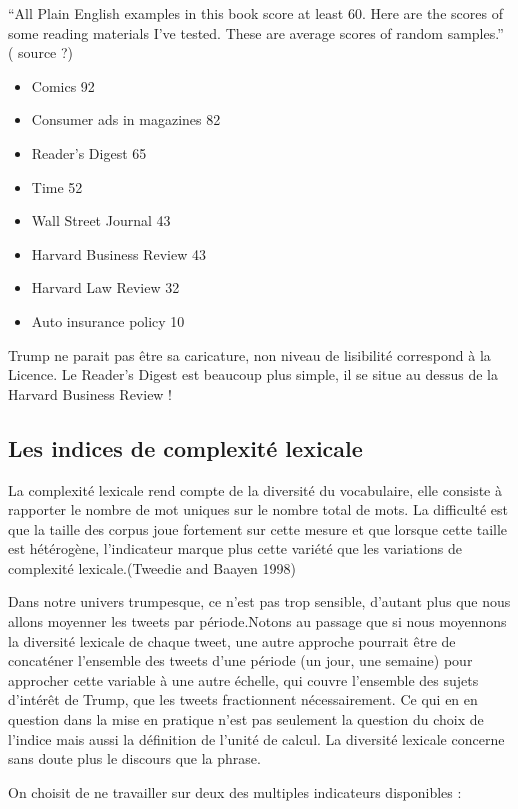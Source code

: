 \documentclass[
  letterpaper,
  DIV=11,
  numbers=noendperiod]{scrreprt}
\begin{document}
``All Plain English examples in this book score at least 60. Here are
the scores of some reading materials I've tested. These are average
scores of random samples.'' ( source ?)

\begin{itemize}
\item
  Comics 92
\item
  Consumer ads in magazines 82
\item
  Reader's Digest 65
\item
  Time 52
\item
  Wall Street Journal 43
\item
  Harvard Business Review 43
\item
  Harvard Law Review 32
\item
  Auto insurance policy 10
\end{itemize}

Trump ne parait pas être sa caricature, non niveau de lisibilité
correspond à la Licence. Le Reader's Digest est beaucoup plus simple, il
se situe au dessus de la Harvard Business Review !

\subsection{Les indices de complexité
lexicale}\label{les-indices-de-complexituxe9-lexicale}

La complexité lexicale rend compte de la diversité du vocabulaire, elle
consiste à rapporter le nombre de mot uniques sur le nombre total de
mots. La difficulté est que la taille des corpus joue fortement sur
cette mesure et que lorsque cette taille est hétérogène, l'indicateur
marque plus cette variété que les variations de complexité
lexicale.(Tweedie and Baayen 1998)

Dans notre univers trumpesque, ce n'est pas trop sensible, d'autant plus
que nous allons moyenner les tweets par période.Notons au passage que si
nous moyennons la diversité lexicale de chaque tweet, une autre approche
pourrait être de concaténer l'ensemble des tweets d'une période (un
jour, une semaine) pour approcher cette variable à une autre échelle,
qui couvre l'ensemble des sujets d'intérêt de Trump, que les tweets
fractionnent nécessairement. Ce qui en en question dans la mise en
pratique n'est pas seulement la question du choix de l'indice mais aussi
la définition de l'unité de calcul. La diversité lexicale concerne sans
doute plus le discours que la phrase.

On choisit de ne travailler sur deux des multiples indicateurs
disponibles :
\end{document}

